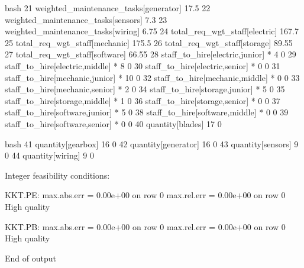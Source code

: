     \begin{boxminted}{bash}
        21 weighted_maintenance_tasks[generator]
        17.5                             
        22 weighted_maintenance_tasks[sensors]
                7.3                             
        23 weighted_maintenance_tasks[wiring]
                6.75                             
        24 total_req_wgt_staff[electric]
            167.7                             
        25 total_req_wgt_staff[mechanic]
            175.5                             
        26 total_req_wgt_staff[storage]
            89.55                             
        27 total_req_wgt_staff[software]
            66.55                             
        28 staff_to_hire[electric,junior]
        *              4             0               
        29 staff_to_hire[electric,middle]
        *              8             0               
        30 staff_to_hire[electric,senior]
        *              0             0               
        31 staff_to_hire[mechanic,junior]
        *             10             0               
        32 staff_to_hire[mechanic,middle]
        *              0             0               
        33 staff_to_hire[mechanic,senior]
        *              2             0               
        34 staff_to_hire[storage,junior]
        *              5             0               
        35 staff_to_hire[storage,middle]
        *              1             0               
        36 staff_to_hire[storage,senior]
        *              0             0               
        37 staff_to_hire[software,junior]
        *              5             0               
        38 staff_to_hire[software,middle]
        *              0             0               
        39 staff_to_hire[software,senior]
        *              0             0               
        40 quantity[blades]
                17             0               
    \end{boxminted}
    \newpage
    \vspace{2pt}
    \begin{boxminted}{bash}
        41 quantity[gearbox]
        16             0               
        42 quantity[generator]
                16             0               
        43 quantity[sensors]
                9             0               
        44 quantity[wiring]
                9             0               

        Integer feasibility conditions:

        KKT.PE: max.abs.err = 0.00e+00 on row 0
        max.rel.err = 0.00e+00 on row 0
        High quality

        KKT.PB: max.abs.err = 0.00e+00 on row 0
        max.rel.err = 0.00e+00 on row 0
        High quality

        End of output
    \end{boxminted}
